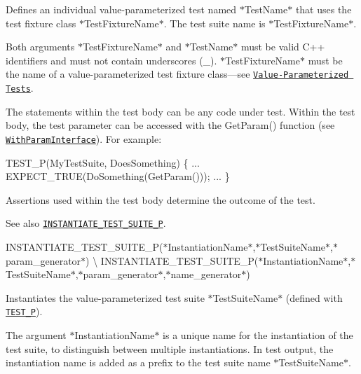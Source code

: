 Defines an individual value-\/parameterized test named $\ast${\ttfamily Test\+Name}$\ast$ that uses the test fixture class $\ast${\ttfamily Test\+Fixture\+Name}$\ast$. The test suite name is $\ast${\ttfamily Test\+Fixture\+Name}$\ast$.

Both arguments $\ast${\ttfamily Test\+Fixture\+Name}$\ast$ and $\ast${\ttfamily Test\+Name}$\ast$ must be valid C++ identifiers and must not contain underscores ({\ttfamily \+\_\+}). $\ast${\ttfamily Test\+Fixture\+Name}$\ast$ must be the name of a value-\/parameterized test fixture class—see \href{../advanced.md#value-parameterized-tests}{\tt Value-\/\+Parameterized Tests}.

The statements within the test body can be any code under test. Within the test body, the test parameter can be accessed with the {\ttfamily Get\+Param()} function (see \href{#WithParamInterface}{\tt {\ttfamily With\+Param\+Interface}}). For example\+:


\begin{DoxyCode}
TEST\_P(MyTestSuite, DoesSomething) \{
  ...
  EXPECT\_TRUE(DoSomething(GetParam()));
  ...
\}
\end{DoxyCode}


Assertions used within the test body determine the outcome of the test.

See also \href{#INSTANTIATE_TEST_SUITE_P}{\tt {\ttfamily I\+N\+S\+T\+A\+N\+T\+I\+A\+T\+E\+\_\+\+T\+E\+S\+T\+\_\+\+S\+U\+I\+T\+E\+\_\+P}}.

{\ttfamily I\+N\+S\+T\+A\+N\+T\+I\+A\+T\+E\+\_\+\+T\+E\+S\+T\+\_\+\+S\+U\+I\+T\+E\+\_\+P(}$\ast${\ttfamily Instantiation\+Name}$\ast${\ttfamily ,}$\ast${\ttfamily Test\+Suite\+Name}$\ast${\ttfamily ,}$\ast${\ttfamily param\+\_\+generator}$\ast${\ttfamily )} \textbackslash{} {\ttfamily I\+N\+S\+T\+A\+N\+T\+I\+A\+T\+E\+\_\+\+T\+E\+S\+T\+\_\+\+S\+U\+I\+T\+E\+\_\+P(}$\ast${\ttfamily Instantiation\+Name}$\ast${\ttfamily ,}$\ast${\ttfamily Test\+Suite\+Name}$\ast${\ttfamily ,}$\ast${\ttfamily param\+\_\+generator}$\ast${\ttfamily ,}$\ast${\ttfamily name\+\_\+generator}$\ast${\ttfamily )}

Instantiates the value-\/parameterized test suite $\ast${\ttfamily Test\+Suite\+Name}$\ast$ (defined with \href{#TEST_P}{\tt {\ttfamily T\+E\+S\+T\+\_\+P}}).

The argument $\ast${\ttfamily Instantiation\+Name}$\ast$ is a unique name for the instantiation of the test suite, to distinguish between multiple instantiations. In test output, the instantiation name is added as a prefix to the test suite name $\ast${\ttfamily Test\+Suite\+Name}$\ast$.

